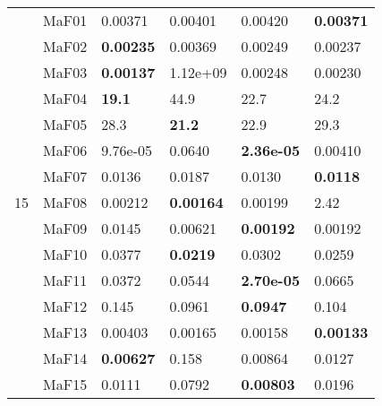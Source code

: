 \documentclass[]{article}
\begin{document}
\begin{table}
\begin{footnotesize}
\begin{tabular}{|l|l|l|l|l|l|}
\multirow{15}{*}{15} & MaF01 & \cellcolor{gray95} 0.00371 & 0.00401 & 0.00420 & \cellcolor{gray95} {\bf 0.00371}\\
 & MaF02 & \cellcolor{gray95} {\bf 0.00235} & 0.00369 & 0.00249 & \cellcolor{gray95} 0.00237\\
 & MaF03 & \cellcolor{gray95} {\bf 0.00137} & 1.12e+09 & 0.00248 & 0.00230\\
 & MaF04 & \cellcolor{gray95} {\bf 19.1} & 44.9 & 22.7 & 24.2\\
 & MaF05 & 28.3 & \cellcolor{gray95} {\bf 21.2} & \cellcolor{gray95} 22.9 & 29.3\\
 & MaF06 & 9.76e-05 & 0.0640 & \cellcolor{gray95} {\bf 2.36e-05} & 0.00410\\
 & MaF07 & 0.0136 & 0.0187 & 0.0130 & \cellcolor{gray95} {\bf 0.0118}\\
 & MaF08 & 0.00212 & \cellcolor{gray95} {\bf 0.00164} & 0.00199 & 2.42\\
 & MaF09 & 0.0145 & 0.00621 & \cellcolor{gray95} {\bf 0.00192} & \cellcolor{gray95} 0.00192\\
 & MaF10 & 0.0377 & \cellcolor{gray95} {\bf 0.0219} & 0.0302 & 0.0259\\
 & MaF11 & 0.0372 & 0.0544 & \cellcolor{gray95} {\bf 2.70e-05} & 0.0665\\
 & MaF12 & 0.145 & \cellcolor{gray95} 0.0961 & \cellcolor{gray95} {\bf 0.0947} & 0.104\\
 & MaF13 & 0.00403 & 0.00165 & 0.00158 & \cellcolor{gray95} {\bf 0.00133}\\
 & MaF14 & \cellcolor{gray95} {\bf 0.00627} & 0.158 & \cellcolor{gray95} 0.00864 & 0.0127\\
 & MaF15 & 0.0111 & 0.0792 & \cellcolor{gray95} {\bf 0.00803} & 0.0196\\
\hline
\end{tabular}
\end{footnotesize}
\end{table}
\end{document}
